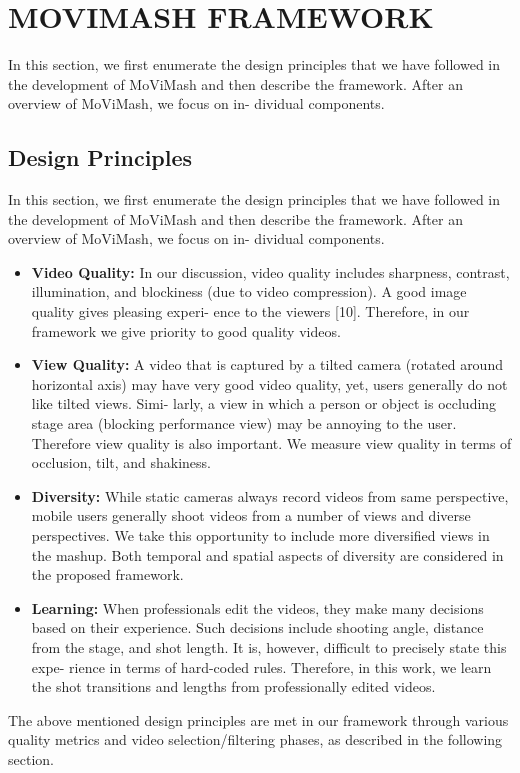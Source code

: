 \documentclass{sig-alternate-05-2015}
\begin{document}
\section{MOVIMASH FRAMEWORK}
In this section, we first enumerate the design principles that we
have followed in the development of MoViMash and then describe
the framework. After an overview of MoViMash, we focus on in-
dividual components.
\subsection{Design Principles}
In this section, we first enumerate the design principles that we
have followed in the development of MoViMash and then describe
the framework. After an overview of MoViMash, we focus on in-
dividual components.
\begin{itemize}

\item \textbf{Video Quality:} In our discussion, video quality includes
sharpness, contrast, illumination, and blockiness (due to video
compression). A good image quality gives pleasing experi-
ence to the viewers [10]. Therefore, in our framework we
give priority to good quality videos.

\item \textbf{View Quality:} A video that is captured by a tilted camera
(rotated around horizontal axis) may have very good video
quality, yet, users generally do not like tilted views. Simi-
larly, a view in which a person or object is occluding stage
area (blocking performance view) may be annoying to the user. Therefore view quality is also important. We measure view quality in terms of occlusion, tilt, and shakiness.

\item  \textbf{Diversity:} While static cameras always record videos from
same perspective, mobile users generally shoot videos from
a number of views and diverse perspectives. We take this
opportunity to include more diversified views in the mashup.
Both temporal and spatial aspects of diversity are considered
in the proposed framework.
\item \textbf{Learning:} When professionals edit the videos, they make
many decisions based on their experience. Such decisions
include shooting angle, distance from the stage, and shot
length. It is, however, difficult to precisely state this expe-
rience in terms of hard-coded rules. Therefore, in this work,
we learn the shot transitions and lengths from professionally
edited videos.
\end{itemize}
The above mentioned design principles are met in our framework
through various quality metrics and video selection/filtering phases,
as described in the following section.
\end{document}
